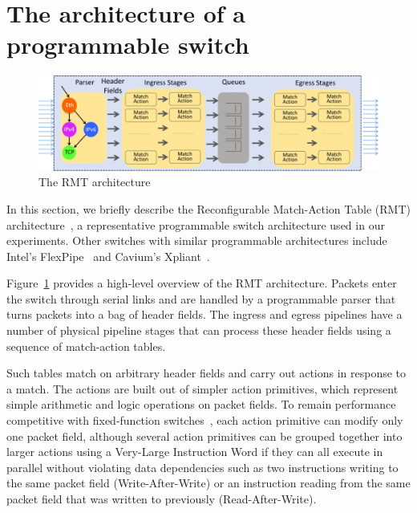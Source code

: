 \section{The architecture of a programmable switch}
\label{s:context}

\begin{figure}
\includegraphics[width=\textwidth]{p4_switch_model.png}
\caption{The RMT architecture}
\label{fig:architecture}
\end{figure}

\label{s:architecture}
In this section, we briefly describe the Reconfigurable Match-Action Table
(RMT) architecture~\cite{rmt}, a representative programmable switch
architecture used in our experiments. Other switches with similar programmable
architectures include Intel's FlexPipe~\cite{flexpipe} and Cavium's
Xpliant~\cite{xpliant}.

Figure~\ref{fig:architecture} provides a high-level overview of the RMT
architecture. Packets enter the switch through serial links and are handled by
a programmable parser that turns packets into a bag of header fields. The
ingress and egress pipelines have a number of physical pipeline stages that can
process these header fields using a sequence of match-action tables.

Such tables match on arbitrary header fields and carry out actions in response
to a match.  The actions are built out of simpler action primitives, which
represent simple arithmetic and logic operations on packet fields. To remain
performance competitive with fixed-function switches~\cite{mellanox, trident,
tomahawk}, each action primitive can modify only one packet field, although
several action primitives can be grouped together into larger actions using a
Very-Large Instruction Word if they can all execute in parallel without
violating data dependencies such as two instructions writing to the same packet
field (Write-After-Write) or an instruction reading from the same packet field
that was written to previously (Read-After-Write).

